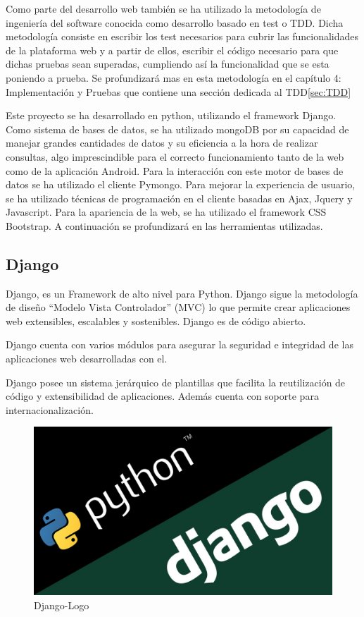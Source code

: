 \documentclass[a4paper,11pt]{book}
\begin{document}
Como parte del desarrollo web también se ha utilizado la metodología de ingeniería del software conocida como desarrollo basado en test o TDD. Dicha metodología consiste en escribir los test necesarios para cubrir las funcionalidades de la plataforma web y a partir de ellos, escribir el código necesario para que dichas pruebas sean superadas, cumpliendo así la funcionalidad que se esta poniendo a prueba.  Se profundizará mas en esta metodología en el capítulo 4: Implementación y Pruebas que contiene una sección dedicada al TDD\ref{sec:TDD}

Este proyecto se ha desarrollado en python, utilizando el framework Django. Como sistema de bases de datos, se ha utilizado mongoDB por su capacidad de manejar grandes cantidades de datos y su eficiencia a la hora de realizar consultas, algo imprescindible para el correcto funcionamiento tanto de la web como de la aplicación Android. Para la interacción con este motor de bases de datos se ha utilizado el cliente Pymongo. Para mejorar la experiencia de usuario, se ha utilizado técnicas de programación en el cliente basadas en Ajax, Jquery y Javascript. Para la apariencia de la web, se ha utilizado el framework CSS Bootstrap. A continuación se profundizará en las herramientas utilizadas. 

 



\subsection{Django}
Django\cite{dj}, es un Framework de alto nivel para Python. Django sigue la metodología de diseño “Modelo Vista Controlador” (MVC) lo que permite crear aplicaciones web extensibles, escalables y sostenibles. Django es de código abierto. 

Django cuenta con varios módulos para asegurar la seguridad e integridad de las aplicaciones web desarrolladas con el. 

Django posee un sistema jerárquico de plantillas que facilita la reutilización de código y extensibilidad de aplicaciones. Además cuenta con soporte para internacionalización.

\begin{figure}[H] 
\centering 
\includegraphics[scale=0.25]{imagenes/desarrollo_herramienta/django.jpg}
\caption{ Django-Logo\cite{djL}  }  
\end{figure} 
\end{document}
